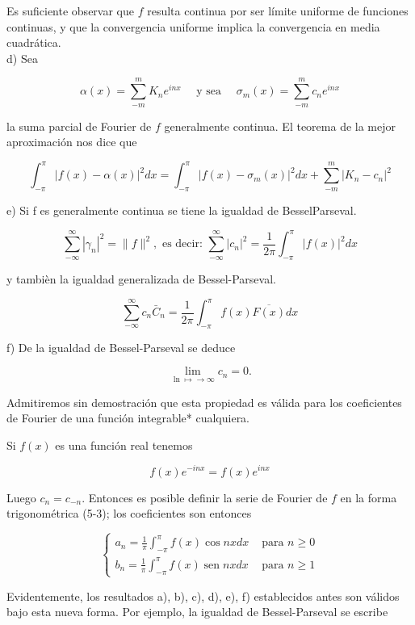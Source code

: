 \documentclass[10pt]{article}
\theoremstyle{plain}
\theoremstyle{definition}
\theoremstyle{remark}
\begin{document}
Es suficiente observar que $f$ resulta continua por ser límite uniforme de funciones continuas, y que la convergencia uniforme implica la convergencia en media cuadrática.\\
d) Sea

$$
\alpha(x)=\sum_{-m}^{m} K_{n} e^{i n x} \quad \text { y sea } \quad \sigma_{m}(x)=\sum_{-m}^{m} c_{n} e^{i n x}
$$

la suma parcial de Fourier de $f$ generalmente continua. El teorema de la mejor aproximación nos dice que

$$
\int_{-\pi}^{\pi}|f(x)-\alpha(x)|^{2} d x=\int_{-\pi}^{\pi}\left|f(x)-\sigma_{m}(x)\right|^{2} d x+\sum_{-m}^{m}\left|K_{n}-c_{n}\right|^{2}
$$

e) Si f es generalmente continua se tiene la igualdad de BesselParseval.

$$
\sum_{-\infty}^{\infty}\left|\gamma_{n}\right|^{2}=\|f\|^{2}, \text { es decir: } \sum_{-\infty}^{\infty}\left|c_{n}\right|^{2}=\frac{1}{2 \pi} \int_{-\pi}^{\pi}|f(x)|^{2} d x
$$

y tambièn la igualdad generalizada de Bessel-Parseval.

$$
\sum_{-\infty}^{\infty} c_{n} \bar{C}_{n}=\frac{1}{2 \pi} \int_{-\pi}^{\pi} f(x) \overline{F(x)} d x
$$

f) De la igualdad de Bessel-Parseval se deduce

$$
\lim _{\ln \mapsto \rightarrow \infty} c_{n}=0 .
$$

Admitiremos sin demostración que esta propiedad es válida para los coeficientes de Fourier de una función integrable* cualquiera.

Si $f(x)$ es una función real tenemos

$$
f(x) e^{-i n x}=f(x) e^{i n x}
$$

Luego $c_{n}=c_{-n}$. Entonces es posible definir la serie de Fourier de $f$ en la forma trigonométrica (5-3); los coeficientes son entonces

\[
\begin{cases}a_{n}=\frac{1}{\pi} \int_{-\pi}^{\pi} f(x) \cos n x d x & \text { para } n \geqslant 0  \tag{5-9}\\ b_{n}=\frac{1}{\pi} \int_{-\pi}^{\pi} f(x) \operatorname{sen} n x d x & \text { para } n \geqslant 1\end{cases}
\]

Evidentemente, los resultados a), b), c), d), e), f) establecidos antes son válidos bajo esta nueva forma. Por ejemplo, la igualdad de Bessel-Parseval se escribe
\end{document}
